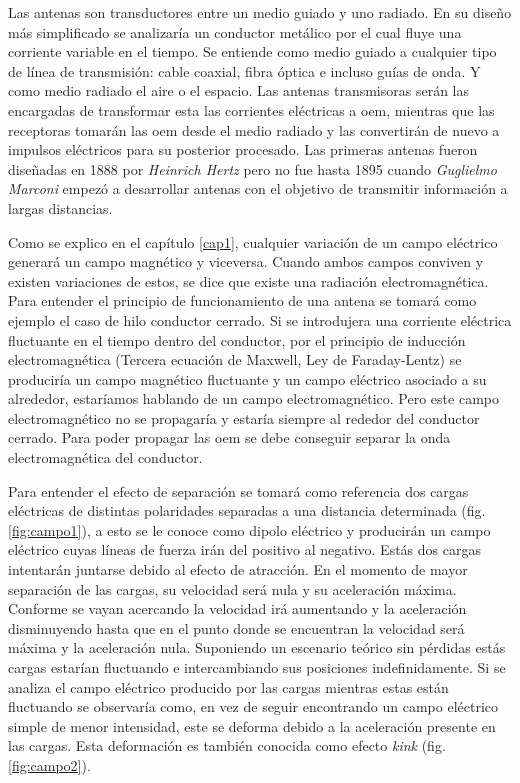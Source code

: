 \par Las antenas son transductores entre un medio guiado y uno radiado. En su diseño más simplificado se analizaría un conductor metálico por el cual fluye una corriente variable en el tiempo. Se entiende como medio guiado a cualquier tipo de línea de transmisión: cable coaxial, fibra óptica e incluso guías de onda. Y como medio radiado el aire o el espacio. Las antenas transmisoras serán las encargadas de transformar esta las corrientes eléctricas a \gls{oem}, mientras que las receptoras tomarán las \gls{oem} desde el medio radiado y las convertirán de nuevo a impulsos eléctricos para su posterior procesado. Las primeras antenas fueron diseñadas en 1888 por \textit{Heinrich Hertz} pero no fue hasta 1895 cuando \textit{Guglielmo Marconi} empezó a desarrollar antenas con el objetivo de transmitir información a largas distancias. \cite{Cardama2002}
\\
\par Como se explico en el capítulo \ref{cap1}, cualquier variación de un campo eléctrico generará un campo magnético y viceversa. Cuando ambos campos conviven y existen variaciones de estos, se dice que existe una radiación electromagnética. Para entender el principio de funcionamiento de una antena se tomará como ejemplo el caso de hilo conductor cerrado. Si se introdujera una corriente eléctrica fluctuante en el tiempo dentro del conductor, por el principio de inducción electromagnética (Tercera ecuación de Maxwell, Ley de Faraday-Lentz) se produciría un campo magnético fluctuante y un campo eléctrico asociado a su alrededor, estaríamos hablando de un campo electromagnético. Pero este campo electromagnético no se propagaría y estaría siempre al rededor del conductor cerrado. Para poder propagar las \gls{oem} se debe conseguir separar la onda electromagnética del conductor. \cite{LearnEngineering2019}
\\
\par Para entender el efecto de separación se tomará como referencia dos cargas eléctricas de distintas polaridades separadas a una distancia determinada (fig. \ref{fig:campo1}), a esto se le conoce como dipolo eléctrico y producirán un campo eléctrico cuyas líneas de fuerza irán del positivo al negativo. Estás dos cargas intentarán juntarse debido al efecto de atracción. En el momento de mayor separación de las cargas, su velocidad será nula y su aceleración máxima. Conforme se vayan acercando la velocidad irá aumentando y la aceleración disminuyendo hasta que en el punto donde se encuentran la velocidad será máxima y la aceleración nula. Suponiendo un escenario teórico sin pérdidas estás cargas estarían fluctuando e intercambiando sus posiciones indefinidamente. Si se analiza el campo eléctrico producido por las cargas mientras estas están fluctuando se observaría como, en vez de seguir encontrando un campo eléctrico simple de menor intensidad, este se deforma debido a la aceleración presente en las cargas. Esta deformación es también conocida como efecto \textit{kink} (fig. \ref{fig:campo2}).
